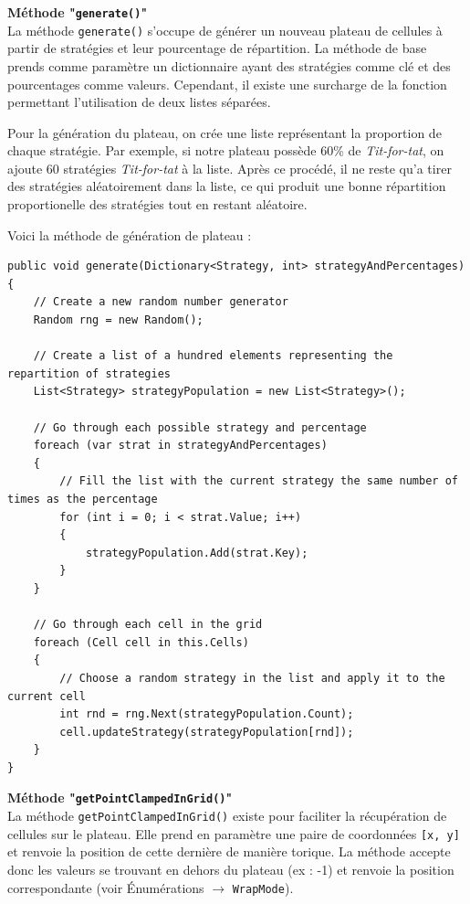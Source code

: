 \documentclass[a4paper]{article}
\begin{document}
\textbf{Méthode "\texttt{generate()}"}\\
La méthode \texttt{generate()} s'occupe de générer un nouveau plateau de cellules à partir de stratégies et leur pourcentage de répartition. La méthode de base prends comme paramètre un dictionnaire ayant des stratégies comme clé et des pourcentages comme valeurs. Cependant, il existe une surcharge de la fonction permettant l'utilisation de deux listes séparées.

Pour la génération du plateau, on crée une liste représentant la proportion de chaque stratégie. Par exemple, si notre plateau possède 60\% de \textit{Tit-for-tat}, on ajoute 60 stratégies \textit{Tit-for-tat} à la liste. Après ce procédé, il ne reste qu'a tirer des stratégies aléatoirement dans la liste, ce qui produit une bonne répartition proportionelle des stratégies tout en restant aléatoire.

Voici la méthode de génération de plateau :
\begin{lstlisting}
public void generate(Dictionary<Strategy, int> strategyAndPercentages)
{
    // Create a new random number generator
    Random rng = new Random();

    // Create a list of a hundred elements representing the repartition of strategies
    List<Strategy> strategyPopulation = new List<Strategy>();

    // Go through each possible strategy and percentage
    foreach (var strat in strategyAndPercentages)
    {
        // Fill the list with the current strategy the same number of times as the percentage
        for (int i = 0; i < strat.Value; i++)
        {
            strategyPopulation.Add(strat.Key);
        }
    }

    // Go through each cell in the grid
    foreach (Cell cell in this.Cells)
    {
        // Choose a random strategy in the list and apply it to the current cell
        int rnd = rng.Next(strategyPopulation.Count);
        cell.updateStrategy(strategyPopulation[rnd]);
    }
}
\end{lstlisting}


\textbf{Méthode "\texttt{getPointClampedInGrid()}"}\\
La méthode \texttt{getPointClampedInGrid()} existe pour faciliter la récupération de cellules sur le plateau. Elle prend en paramètre une paire de coordonnées \texttt{[x, y]} et renvoie la position de cette dernière de manière torique. La méthode accepte donc les valeurs se trouvant en dehors du plateau (ex : -1) et renvoie la position correspondante (voir Énumérations $\rightarrow$ \texttt{WrapMode}).
\end{document}
